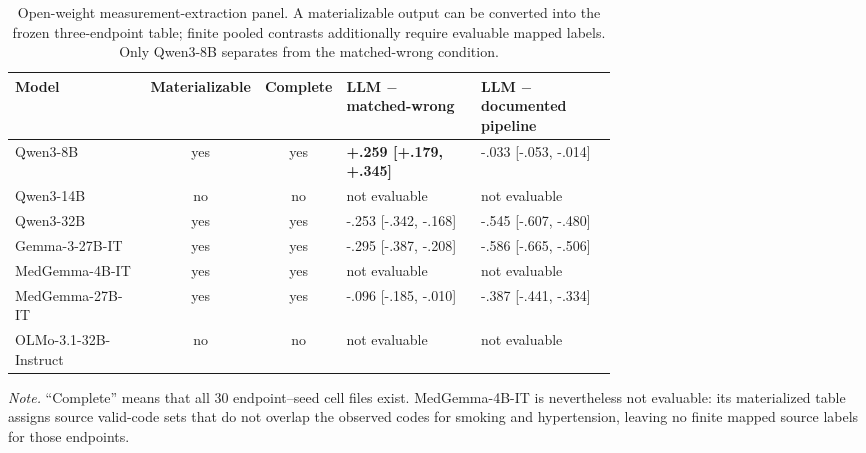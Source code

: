 \begin{table}[t]
\caption{Open-weight measurement-extraction panel. A materializable output can be converted into the frozen three-endpoint table; finite pooled contrasts additionally require evaluable mapped labels. Only Qwen3-8B separates from the matched-wrong condition.}
\label{tab:app-extraction-model-panel}
\label{tab:app_llm_panel}
\centering\scriptsize
\setlength{\tabcolsep}{4pt}
\begin{tabular}{P{0.23\linewidth}ccP{0.235\linewidth}P{0.235\linewidth}}
\toprule Model & Materializable & Complete & LLM $-$ matched-wrong & LLM $-$ documented pipeline \\
\midrule
Qwen3-8B & yes & yes & \textbf{+.259 [+.179, +.345]} & -.033 [-.053, -.014] \\
Qwen3-14B & no & no & not evaluable & not evaluable \\
Qwen3-32B & yes & yes & -.253 [-.342, -.168] & -.545 [-.607, -.480] \\
Gemma-3-27B-IT & yes & yes & -.295 [-.387, -.208] & -.586 [-.665, -.506] \\
MedGemma-4B-IT & yes & yes & not evaluable & not evaluable \\
MedGemma-27B-IT & yes & yes & -.096 [-.185, -.010] & -.387 [-.441, -.334] \\
OLMo-3.1-32B-Instruct & no & no & not evaluable & not evaluable \\
\bottomrule\end{tabular}
\vspace{2pt}\parbox{0.96\linewidth}{\footnotesize \emph{Note.} ``Complete'' means that all 30 endpoint--seed cell files exist. MedGemma-4B-IT is nevertheless not evaluable: its materialized table assigns source valid-code sets that do not overlap the observed codes for smoking and hypertension, leaving no finite mapped source labels for those endpoints.}
\end{table}
